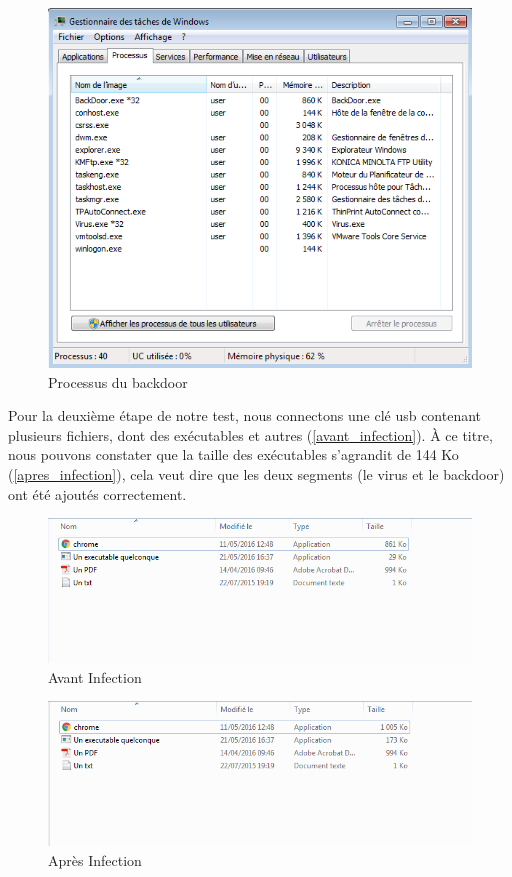 \begin{figure}[H]
    \centering
    \includegraphics[width=\linewidth]{images/processus_backdoor.png}
    \caption{Processus du backdoor}
    \label{process_backdoor}
\end{figure}

Pour la deuxième étape de notre test, nous connectons une clé usb contenant plusieurs fichiers, dont des exécutables et autres (\autoref{avant_infection}). À ce titre, nous pouvons constater que la taille des exécutables s'agrandit de 144 Ko (\autoref{apres_infection}), cela veut dire que les deux segments (le virus et le backdoor) ont été ajoutés correctement.

\begin{figure}[H]
    \centering
    \includegraphics[width=\linewidth]{images/avant_infeciton.png}
    \caption{Avant Infection}
    \label{avant_infection}
\end{figure}

\begin{figure}[H]
    \centering
    \includegraphics[width=\linewidth]{images/apres_infection.png}
    \caption{Après Infection}
    \label{apres_infection}
\end{figure}

